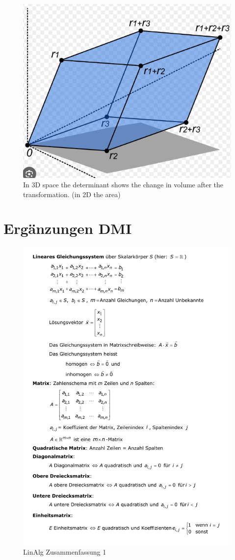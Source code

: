 \documentclass[../Main.tex]{subfiles}
\begin{document}


\begin{figure}[H]
    \centering
    \includegraphics[width=0.5\linewidth]{Images/determinant.png}
    \caption{In 3D space the determinant shows the change in volume after the transformation. (in 2D the area)}
\end{figure}

\section{Ergänzungen DMI}
\begin{figure}[H]
    \centering
    \includegraphics[width=0.75\linewidth]{Images/dmi_1.png}
    \caption{LinAlg Zusammenfassung 1}
\end{figure}
\end{document}
